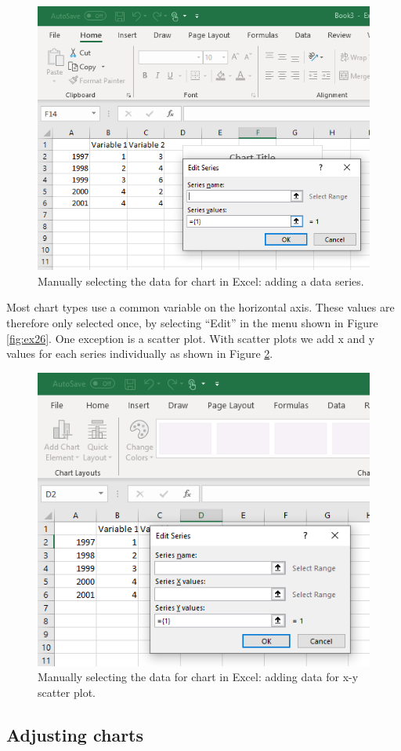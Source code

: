 \documentclass[]{book}
\begin{document}
\begin{figure}

{\centering \includegraphics[width=0.6\linewidth]{_resources/chapter_excelbasic/g4} 

}

\caption{Manually selecting the data for chart in Excel: adding a data series.}\label{fig:ex27}
\end{figure}

Most chart types use a common variable on the horizontal axis. These values are therefore only selected once, by selecting ``Edit'' in the menu shown in Figure \ref{fig:ex26}. One exception is a scatter plot. With scatter plots we add x and y values for each series individually as shown in Figure \ref{fig:ex28}.

\begin{figure}

{\centering \includegraphics[width=0.6\linewidth]{_resources/chapter_excelbasic/g5} 

}

\caption{Manually selecting the data for chart in Excel: adding data for x-y scatter plot.}\label{fig:ex28}
\end{figure}

\hypertarget{adjusting-charts}{%
\subsection{Adjusting charts}\label{adjusting-charts}}
\end{document}
